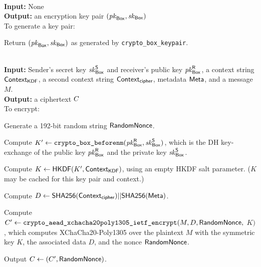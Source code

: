 {\underline {\bf \cboxkeygen}}\\
{\bf Input:} None \\
{\bf Output:} an encryption key pair $(\mathit{pk}_{{\sf Box}}, \mathit{sk}_{{\sf Box}})$ \\

\vspace{-1.5em}
To generate a key pair:

\vspace{-1.5em}
\begingroup
\RaggedRight
\begin{enumerate*}
\item Return $(\mathit{pk}_{{\sf Box}}, \mathit{sk}_{{\sf Box}})$ as generated by \texttt{crypto\_box\_keypair}.
\end{enumerate*}
\endgroup


{\underline {\bf \cboxencrypt}} \\
{\bf Input:} Sender's secret key $\mathit{sk}_{{\sf Box}}^{\sf S}$ and receiver's public key $\mathit{pk}_{{\sf Box}}^{\sf R}$, a context string
${\sf Context}_\textsf{KDF}$, a second context string ${\sf Context}_\textsf{cipher}$, metadata ${\sf Meta}$,
and a message $M$. \\
{\bf Output:} a ciphertext $C$ \\

\vspace{-1.5em}
To encrypt:

\vspace{-1.5em}
\begingroup
\RaggedRight
\begin{enumerate*}
\item Generate a 192-bit random string ${\sf RandomNonce}$.
\item Compute $K' \leftarrow \texttt{crypto\_box\_beforenm}(\mathit{pk}_{{\sf Box}}^{\sf R}, \mathit{sk}_{{\sf Box}}^{\sf S})$, which is the DH
key-exchange of the public key $\mathit{pk}_{{\sf Box}}^{\sf R}$ and the private key $\mathit{sk}_{{\sf Box}}^{\sf S}$.
\item Compute $K \leftarrow {\sf HKDF}(K', {\sf Context}_\textsf{KDF})$, using an empty HKDF salt parameter.
($K$ may be cached for this key pair and context.)
\item Compute $D \leftarrow {\sf SHA256}({\sf Context}_\textsf{cipher}) || {\sf SHA256}({\sf Meta})$.
\item Compute $C' \leftarrow \texttt{crypto\_aead\_xchacha20poly1305\_ietf\_encrypt}(M, D,
{\sf RandomNonce},$ $K)$, which computes XChaCha20-Poly1305 over the plaintext $M$ with the symmetric key
$K$, the associated data $D$, and the nonce ${\sf RandomNonce}$.
\item Output $C \leftarrow (C', {\sf RandomNonce})$.
\end{enumerate*}
\endgroup

